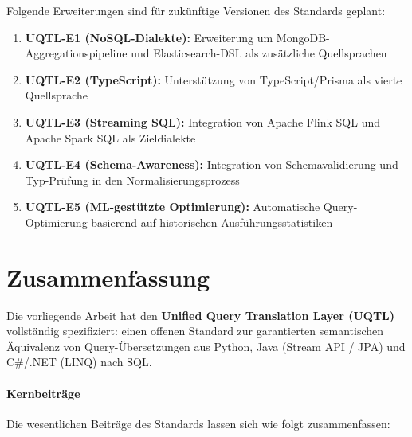 Folgende Erweiterungen sind für zukünftige Versionen des Standards geplant:

\begin{enumerate}[leftmargin=1.5cm]
  \item \textbf{UQTL-E1 (NoSQL-Dialekte):} Erweiterung um MongoDB-Aggregations\-pipeline
    und Elasticsearch-DSL als zusätzliche Quellsprachen
  \item \textbf{UQTL-E2 (TypeScript):} Unterstützung von TypeScript/Prisma als
    vierte Quellsprache
  \item \textbf{UQTL-E3 (Streaming SQL):} Integration von Apache Flink SQL und
    Apache Spark SQL als Zieldialekte
  \item \textbf{UQTL-E4 (Schema-Awareness):} Integration von Schemavalidierung
    und Typ-Prüfung in den Normalisierungsprozess
  \item \textbf{UQTL-E5 (ML-gestützte Optimierung):} Automatische Query-Optimierung
    basierend auf historischen Ausführungsstatistiken
\end{enumerate}

\section{Zusammenfassung}
\label{sec:zusammenfassung}

Die vorliegende Arbeit hat den \textbf{Unified Query Translation Layer (UQTL)}
vollständig spezifiziert: einen offenen Standard zur garantierten semantischen
Äquivalenz von Query-Übersetzungen aus Python, Java (Stream API / JPA) und
C\#/.NET (LINQ) nach SQL.

\paragraph{Kernbeiträge}
Die wesentlichen Beiträge des Standards lassen sich wie folgt zusammenfassen:


